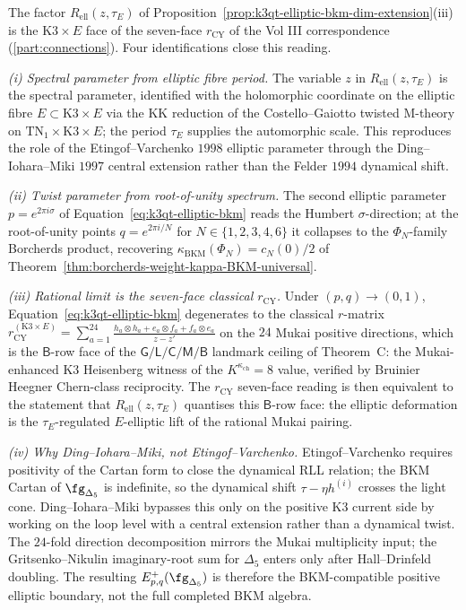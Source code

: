 \begin{remark}
\label{rem:k3qt-elliptic-R-k3xE-face}
The factor $R_{\mathrm{ell}}(z, \tau_E)$ of
Proposition~\ref{prop:k3qt-elliptic-bkm-dim-extension}(iii) is the
$\mathrm K3 \times E$ face of the seven-face $r_{\mathrm{CY}}$ of
the Vol III correspondence (\ref{part:connections}). Four identifications
close this reading.

\emph{(i) Spectral parameter from elliptic fibre period.} The
variable $z$ in $R_{\mathrm{ell}}(z, \tau_E)$ is the spectral
parameter, identified with the holomorphic coordinate on the
elliptic fibre $E \subset \mathrm K3 \times E$ via the KK reduction
of the Costello--Gaiotto twisted M-theory on
$\mathrm{TN}_1 \times \mathrm K3 \times E$; the period $\tau_E$
supplies the automorphic scale. This reproduces the role of the
Etingof--Varchenko $1998$ elliptic parameter through the
Ding--Iohara--Miki $1997$ central extension rather than the
Felder $1994$ dynamical shift.

\emph{(ii) Twist parameter from root-of-unity spectrum.} The second
elliptic parameter $p = e^{2\pi i \sigma}$ of
Equation~\eqref{eq:k3qt-elliptic-bkm} reads the Humbert
$\sigma$-direction; at the root-of-unity points
$q = e^{2\pi i / N}$ for $N \in \{1, 2, 3, 4, 6\}$ it collapses to
the $\Phi_N$-family Borcherds product, recovering
$\kappa_{\mathrm{BKM}}(\Phi_N) = c_N(0)/2$ of
\cite{VolI}
Theorem~\ref{thm:borcherds-weight-kappa-BKM-universal}.

\emph{(iii) Rational limit is the seven-face classical
$r_{\mathrm{CY}}$.} Under $(p, q) \to (0, 1)$,
Equation~\eqref{eq:k3qt-elliptic-bkm} degenerates to the classical
$r$-matrix
$r_{\mathrm{CY}}^{(\mathrm K3 \times E)}
= \sum_{a = 1}^{24}
\frac{h_a \otimes h_a + e_a \otimes f_a + f_a \otimes e_a}{z - z'}$
on the $24$ Mukai positive directions, which is the $\mathsf B$-row face
of the
$\mathsf{G} / \mathsf{L} / \mathsf{C} / \mathsf{M} / \mathsf{B}$
landmark ceiling of Theorem~C: the Mukai-enhanced K3 Heisenberg
witness of the $K^{\kappa_{\mathrm{ch}}}=8$ value, verified by
Bruinier Heegner Chern-class reciprocity.
The
$r_{\mathrm{CY}}$ seven-face reading is then equivalent to the
statement that $R_{\mathrm{ell}}(z, \tau_E)$ quantises this
$\mathsf B$-row face: the elliptic deformation is the
$\tau_E$-regulated $E$-elliptic lift of the rational Mukai pairing.

\emph{(iv) Why Ding--Iohara--Miki, not Etingof--Varchenko.}
Etingof--Varchenko requires positivity of the Cartan form to close
the dynamical RLL relation; the BKM Cartan of $\fg_{\Delta_5}$ is
indefinite, so the dynamical shift
$\tau - \eta h^{(i)}$ crosses the light cone. Ding--Iohara--Miki
bypasses this only on the positive K3 current side by working on the
loop level with a central extension rather than a dynamical twist. The
$24$-fold direction decomposition mirrors the Mukai multiplicity input;
the Gritsenko--Nikulin imaginary-root sum for $\Delta_5$ enters only
after Hall--Drinfeld doubling. The resulting
$E^+_{p,q}(\fg_{\Delta_5})$ is therefore the BKM-compatible positive
elliptic boundary, not the full completed BKM algebra.


\end{remark}
